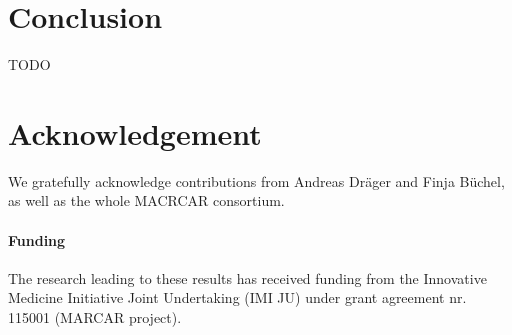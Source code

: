 \documentclass{bioinfo}
\begin{document}
\section{Conclusion}

TODO



\section*{Acknowledgement}
We gratefully acknowledge contributions from Andreas Dr\"ager and Finja B\"uchel, as well as the whole MACRCAR consortium.

\paragraph{Funding\textcolon} The research leading to these results has received funding from the Innovative Medicine Initiative Joint Undertaking (IMI JU) under grant agreement nr. 115001 (MARCAR project).


%
%
%
%
%


\end{document}
